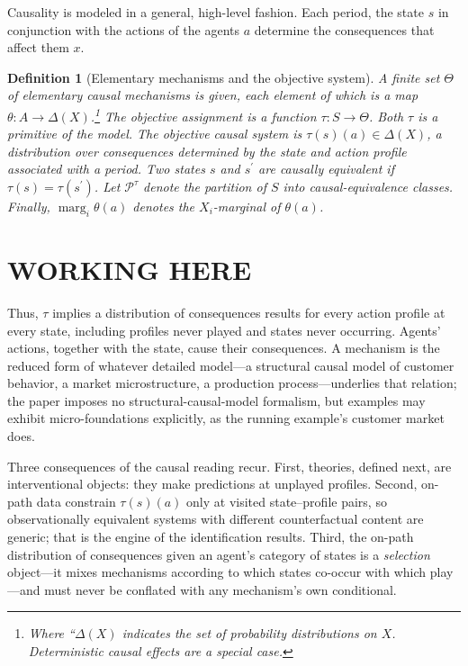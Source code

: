 \documentclass[11pt]{article}
\newtheorem{definition}[assumption]{Definition}
\theoremstyle{definition}
\newcommand{\marg}[1]{\operatorname{marg}_{#1}}
\begin{document}
Causality is modeled in a general, high-level fashion.
Each period, the state \(s\) in conjunction with the actions of the agents \(a\) determine the consequences that affect them \(x\).


\begin{definition}[Elementary mechanisms and the objective system]
\label{def:mechanisms}
A finite set $\Theta$ of \emph{elementary causal mechanisms} is given, each element of which is a map $\theta:A\to\Delta(X)$.\footnote
{
	Where ``\(\Delta(X)\) indicates the set of probability distributions on \(X\).
	Deterministic causal effects are a special case.
}
The \emph{objective assignment} is a function $\tau:S\to\Theta$.
Both \(\tau\) is a primitive of the model.
The \emph{objective causal system} is $\tau(s)(a)\in\Delta(X)$, a distribution over consequences determined by the state and action profile associated with a period.
Two states \(s\) and \(s^\prime\) are \emph{causally equivalent} if $\tau(s)=\tau(s^\prime)$. 
Let $\mathcal P^{\tau}$ denote the partition of $S$ into causal-equivalence classes. 
Finally, $\marg{i}\theta(a)$ denotes the $X_i$-marginal of $\theta(a)$.
\end{definition}

\section{WORKING HERE}
Thus, $\tau$ implies a distribution of consequences results for every action profile at every state, including profiles never played and states never occurring.
Agents' actions, together with the state, cause their consequences.
A mechanism is the reduced form of whatever detailed model---a structural causal model of customer behavior, a market microstructure, a production process---underlies that relation; the paper imposes no structural-causal-model formalism, but examples may exhibit micro-foundations explicitly, as the running example's customer market does.

Three consequences of the causal reading recur.
First, theories, defined next, are interventional objects: they make predictions at unplayed profiles.
Second, on-path data constrain $\tau(s)(a)$ only at visited state--profile pairs, so observationally equivalent systems with different counterfactual content are generic; that is the engine of the identification results.
Third, the on-path distribution of consequences given an agent's category of states is a \emph{selection} object---it mixes mechanisms according to which states co-occur with which play---and must never be conflated with any mechanism's own conditional.
\end{document}
